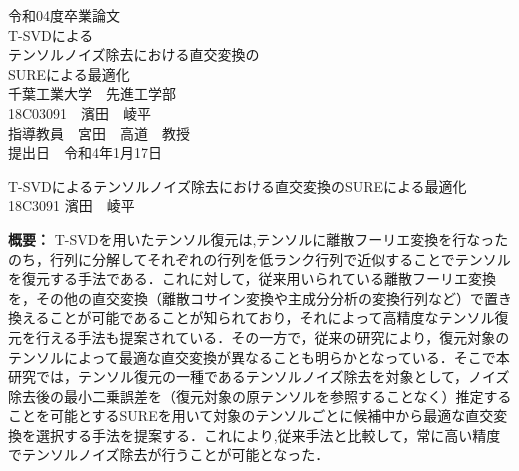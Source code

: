 \documentclass[a4paper,12pt,report]{jsbook}
\newenvironment{longbox}{%
  \def\FrameCommand{\fboxsep=\FrameSep \fbox}%
  \MakeFramed {\FrameRestore}}%
 {\endMakeFramed}
\begin{document}
%
%
\begin{titlepage}
\begin{center}
{\large 令和04度卒業論文\\}
\vspace{2.5cm}
{\fontsize{36pt}{40pt}\selectfont%
 T-SVDによる\\テンソルノイズ除去における直交変換の\\SUREによる最適化\\}
\vspace{3cm}
{\large%
  千葉工業大学　先進工学部　\\
  \vspace{3mm}18C03091　濱田　崚平\\
  \vspace{2cm}指導教員　宮田　高道　教授\\
  \vspace{5mm}提出日　令和4年1月17日\\
}%
\end{center}
\end{titlepage}

\begin{titlepage}
\begin{longbox}
\begin{center}
 {\Huge T-SVDによるテンソルノイズ除去における直交変換のSUREによる最適化}\\
 {\large%
   \vspace{3mm}%
   18C3091 濱田　崚平\\
 }
\end{center}
{\bf 概要：}%
T-SVDを用いたテンソル復元は,テンソルに離散フーリエ変換を行なったのち，行列に分解してそれぞれの行列を低ランク行列で近似することでテンソルを復元する手法である．これに対して，従来用いられている離散フーリエ変換を，その他の直交変換（離散コサイン変換や主成分分析の変換行列など）で置き換えることが可能であることが知られており，それによって高精度なテンソル復元を行える手法も提案されている．その一方で，従来の研究により，復元対象のテンソルによって最適な直交変換が異なることも明らかとなっている．そこで本研究では，テンソル復元の一種であるテンソルノイズ除去を対象として，ノイズ除去後の最小二乗誤差を（復元対象の原テンソルを参照することなく）推定することを可能とするSUREを用いて対象のテンソルごとに候補中から最適な直交変換を選択する手法を提案する．これにより,従来手法と比較して，常に高い精度でテンソルノイズ除去が行うことが可能となった．
\\
\\
\end{longbox}
\end{titlepage}
\end{document}
